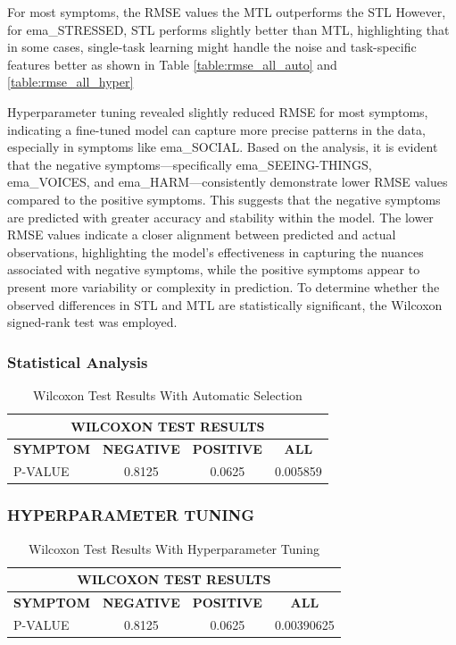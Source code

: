 For most symptoms, the RMSE values the MTL outperforms the STL However, for ema\_STRESSED, STL performs slightly better than MTL, highlighting that in some cases, single-task learning might handle the noise and task-specific features better as shown in Table \ref{table:rmse_all_auto} and \ref{table:rmse_all_hyper}

Hyperparameter tuning revealed slightly reduced RMSE for most symptoms, indicating a fine-tuned model can capture more precise patterns in the data,  especially in symptoms like ema\_SOCIAL. Based on the analysis, it is evident that the negative symptoms—specifically ema\_SEEING-THINGS, ema\_VOICES, and ema\_HARM—consistently demonstrate lower RMSE values compared to the positive symptoms. This suggests that the negative symptoms are predicted with greater accuracy and stability within the model. The lower RMSE values indicate a closer alignment between predicted and actual observations, highlighting the model's effectiveness in capturing the nuances associated with negative symptoms, while the positive symptoms appear to present more variability or complexity in prediction. To determine whether the observed differences in STL and MTL are statistically significant, the Wilcoxon signed-rank test was employed. 



\subsubsection{Statistical Analysis}


\begin{table}[H]
\centering
\caption{Wilcoxon Test Results With Automatic Selection}
\label{tab:wilcoxon_test_results}
\begin{tabular}{|l|c|c|c|}
\hline
\multicolumn{4}{|c|}{\textbf{WILCOXON TEST RESULTS}} \\ \hline
\textbf{SYMPTOM} & \textbf{NEGATIVE} & \textbf{POSITIVE} & \textbf{ALL} \\ \hline
P-VALUE & 0.8125 & 0.0625 & 0.005859 \\ \hline
\end{tabular}
\end{table}

\subsubsection{HYPERPARAMETER TUNING}

\begin{table}[H]
\centering
\caption{Wilcoxon Test Results With Hyperparameter Tuning}
\label{tab:wilcoxon_test_hyper}
\begin{tabular}{|l|c|c|c|}
\hline
\multicolumn{4}{|c|}{\textbf{WILCOXON TEST RESULTS}} \\ \hline
\textbf{SYMPTOM} & \textbf{NEGATIVE} & \textbf{POSITIVE} & \textbf{ALL} \\ \hline
P-VALUE & 0.8125 & 0.0625 & 0.00390625 \\ \hline
\end{tabular}
\end{table}

